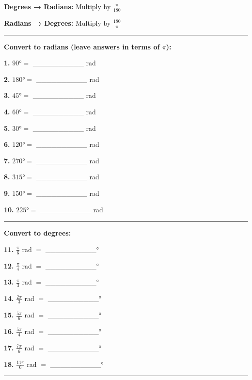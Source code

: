 \documentclass[
  11pt,
]{article}
\begin{document}
\textbf{Degrees → Radians:} Multiply by \(\frac{\pi}{180}\)

\textbf{Radians → Degrees:} Multiply by \(\frac{180}{\pi}\)

\begin{center}\rule{0.5\linewidth}{0.5pt}\end{center}

\textbf{Convert to radians (leave answers in terms of \(\pi\)):}

\textbf{1.} \(90° ={}\) \_\_\_\_\_\_\_\_\_\_ rad

\textbf{2.} \(180° ={}\) \_\_\_\_\_\_\_\_\_\_ rad

\textbf{3.} \(45° ={}\) \_\_\_\_\_\_\_\_\_\_ rad

\textbf{4.} \(60° ={}\) \_\_\_\_\_\_\_\_\_\_ rad

\textbf{5.} \(30° ={}\) \_\_\_\_\_\_\_\_\_\_ rad

\textbf{6.} \(120° ={}\) \_\_\_\_\_\_\_\_\_\_ rad

\textbf{7.} \(270° ={}\) \_\_\_\_\_\_\_\_\_\_ rad

\textbf{8.} \(315° ={}\) \_\_\_\_\_\_\_\_\_\_ rad

\textbf{9.} \(150° ={}\) \_\_\_\_\_\_\_\_\_\_ rad

\textbf{10.} \(225° ={}\) \_\_\_\_\_\_\_\_\_\_ rad

\begin{center}\rule{0.5\linewidth}{0.5pt}\end{center}

\textbf{Convert to degrees:}

\textbf{11.} \(\frac{\pi}{6}\) rad \(={}\) \_\_\_\_\_\_\_\_\_\_°

\textbf{12.} \(\frac{\pi}{4}\) rad \(={}\) \_\_\_\_\_\_\_\_\_\_°

\textbf{13.} \(\frac{\pi}{3}\) rad \(={}\) \_\_\_\_\_\_\_\_\_\_°

\textbf{14.} \(\frac{2\pi}{3}\) rad \(={}\) \_\_\_\_\_\_\_\_\_\_°

\textbf{15.} \(\frac{5\pi}{6}\) rad \(={}\) \_\_\_\_\_\_\_\_\_\_°

\textbf{16.} \(\frac{5\pi}{4}\) rad \(={}\) \_\_\_\_\_\_\_\_\_\_°

\textbf{17.} \(\frac{7\pi}{6}\) rad \(={}\) \_\_\_\_\_\_\_\_\_\_°

\textbf{18.} \(\frac{11\pi}{6}\) rad \(={}\) \_\_\_\_\_\_\_\_\_\_°

\begin{center}\rule{0.5\linewidth}{0.5pt}\end{center}
\end{document}
